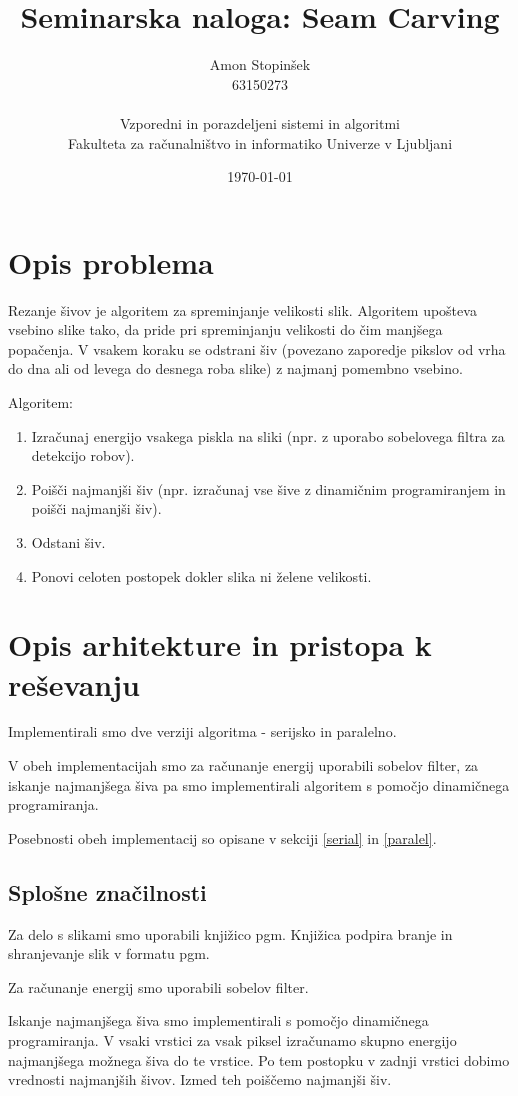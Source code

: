 \documentclass[11pt,a4paper]{article}
\title{Seminarska naloga: Seam Carving}
\author{Amon Stopinšek\\
63150273\\
\ \\
Vzporedni in porazdeljeni sistemi in algoritmi \\
Fakulteta za računalništvo in informatiko Univerze v Ljubljani
\date{\today}         
}
\begin{document}
\maketitle

\section{Opis problema}
Rezanje šivov je algoritem za spreminjanje velikosti slik. Algoritem 
upošteva vsebino slike tako, da pride pri spreminjanju velikosti do
čim manjšega popačenja. V vsakem koraku se odstrani šiv (povezano
zaporedje pikslov od vrha do dna ali od levega do desnega roba slike)
z najmanj pomembno vsebino.


Algoritem:
\begin{enumerate}
\item Izračunaj energijo vsakega piskla na sliki (npr. z uporabo sobelovega filtra za detekcijo robov).
\item Poišči najmanjši šiv (npr. izračunaj vse šive z dinamičnim programiranjem in poišči najmanjši šiv).
\item Odstani šiv.
\item Ponovi celoten postopek dokler slika ni želene velikosti.
\end{enumerate}

\section{Opis arhitekture in pristopa k reševanju}
Implementirali smo dve verziji algoritma - serijsko in paralelno.

V obeh implementacijah smo za računanje energij uporabili
sobelov filter, za iskanje najmanjšega šiva pa smo implementirali
algoritem s pomočjo dinamičnega programiranja.

Posebnosti obeh implementacij so opisane v sekciji \ref{serial} in \ref{paralel}.

\subsection{Splošne značilnosti}
Za delo s slikami smo uporabili knjižico pgm. Knjižica podpira
branje in shranjevanje slik v formatu pgm.



Za računanje energij smo uporabili sobelov filter.

Iskanje najmanjšega šiva smo implementirali s pomočjo dinamičnega
programiranja. V vsaki vrstici za vsak piksel izračunamo skupno 
energijo najmanjšega možnega šiva do te vrstice. Po tem postopku 
v zadnji vrstici dobimo vrednosti najmanjših šivov. Izmed teh
poiščemo najmanjši šiv.
\end{document}

